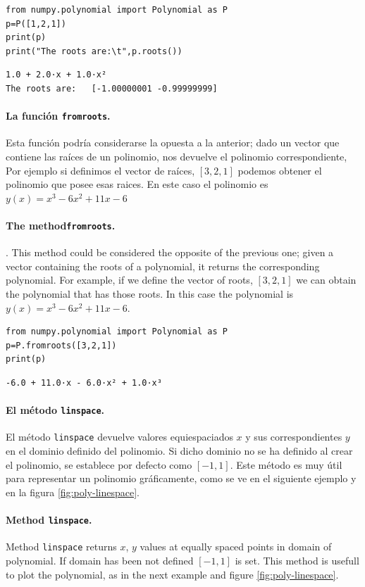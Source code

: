 \begin{verbatim}
from numpy.polynomial import Polynomial as P
p=P([1,2,1])
print(p)
print("The roots are:\t",p.roots())
\end{verbatim}
\begin{verbatim}
1.0 + 2.0·x + 1.0·x²
The roots are:	 [-1.00000001 -0.99999999]
\end{verbatim}
\begin{paracol}{2}
\paragraph{La función \texttt{fromroots}.} Esta función podría considerarse la opuesta a la anterior; dado un vector que contiene las raíces de un polinomio, nos devuelve el polinomio correspondiente, Por ejemplo si definimos el vector de raíces, $[3,2,1]$ podemos obtener el polinomio que posee esas raices. En este caso el polinomio es $y(x)=x^3-6x^2+11x-6$

\switchcolumn

\paragraph{The method\texttt{fromroots}.}. This method could be considered the opposite of the previous one; given a vector containing the roots of a polynomial, it returns the corresponding polynomial. For example, if we define the vector of roots, $[3,2,1]$ we can obtain the polynomial that has those roots. In this case the polynomial is $y(x)=x^3-6x^2+11x-6$.

\end{paracol}
\begin{verbatim}
from numpy.polynomial import Polynomial as P
p=P.fromroots([3,2,1])
print(p)
\end{verbatim}
\begin{verbatim}
-6.0 + 11.0·x - 6.0·x² + 1.0·x³
\end{verbatim}
\begin{paracol}{2}
\paragraph{El método \texttt{linspace}.}
El método  \texttt{linspace} devuelve valores equiespaciados $x$ y sus correspondientes $y$ en el dominio definido del polinomio. Si dicho dominio no se ha definido al crear el polinomio, se establece por defecto como $[-1,1]$. Este método es muy útil para representar un polinomio gráficamente, como se ve en el siguiente ejemplo y en la figura \ref{fig:poly-linespace}.

\switchcolumn

\paragraph{Method \texttt{linspace}.}
Method \texttt{linspace} returns $x$, $y$ values at equally spaced points in domain of polynomial. If domain has been not defined $[-1,1]$ is set. This method is usefull to plot the polynomial, as in the next example and figure \ref{fig:poly-linespace}.

\end{paracol}

